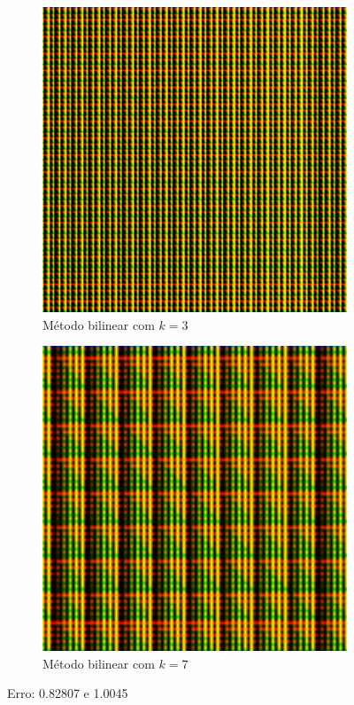 \documentclass[leqno]{article}
\begin{document}
\begin{itemize}
        \begin{figure}[H]
          \centering
          \begin{subfigure}{.45\textwidth}
            \centering
            \includegraphics[width=.7\linewidth]{../images/func_2_color_k3.png}
            \caption{Método bilinear com $k = 3$}
            \label{fig:sub2}
          \end{subfigure}
          \begin{subfigure}{.45\textwidth}
              \centering
              \includegraphics[width=.7\linewidth]{../images/func_2_color_k7.png}
              \caption{Método bilinear com $k = 7$}
              \label{fig:sub1}
            \end{subfigure}%
          \caption{Erro: 0.82807 e 1.0045}
          \label{fig:test}
      \end{figure}


\end{itemize}
\end{document}

